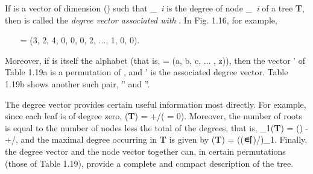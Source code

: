 {\par If  is a vector of dimension 
\textit{\nu}() such that _{\textit{\ i}} is the degree of node _{\textit{\ i}} of a tree \textbf{T}, then  is called the \textit{degree vector associated with} . In Fig. 1.16, for example,

\par \ \ \ 
 = (3, 2, 4, 0, 0, 0, 2, ..., 1, 0, 0).

\par Moreover, if  is itself the alphabet (that is,  = (a, b, c, ... , z)), then the vector ' of Table 1.19a is a permutation of , and ' is the associated degree vector. Table 1.19b shows another such pair, 
\mathbf{n}'' and ''.

\par The degree vector provides certain useful information most directly. For example, since each leaf is of degree zero, 
\textit{\lambda}(\textbf{T}) = +/(\mathbf{d} = 0). Moreover, the number of roots is equal to the number of nodes less the total of the degrees, that is, 
\textbf{\mu}_{1}(\textbf{T}) = 
\textit{\nu}() - +/, and the maximal degree occurring in \textbf{T} is given by 
\textit{\delta}(\textbf{T}) = ((\textbf{∊}⌈\mathbf{d})/\mathbf{d})_{1}. Finally, the degree vector and the node vector together can, in certain permutations (those of Table 1.19), provide a complete and compact description of the tree.

}
